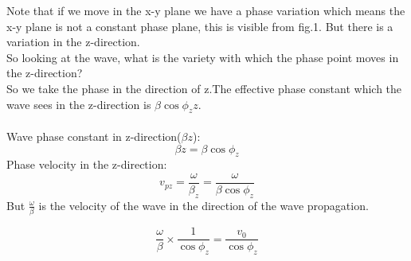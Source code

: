 Note that if we move in the x-y plane we have a phase variation which means the x-y plane is not a constant phase plane, this is visible from fig.1. But there is a variation in the z-direction.
\\
So looking at the wave, what is the variety with which the phase point moves in the z-direction?
\\
So we take the phase in the direction of z.The effective phase constant which the wave sees in the z-direction is $\beta\cos\phi_{z}z$.\\
\\
Wave phase constant in z-direction($\beta z$):
\begin{equation}
	\beta z = \beta\cos\phi_{z}
\end{equation}
Phase velocity in the z-direction:
\begin{equation}
	v_{pz} = \frac{\omega}{\beta_z} = \frac{\omega}{\beta\cos\phi_{z}}
\end{equation}
But $\frac{\omega}{\beta}$ is the velocity of the wave in the direction of the wave propagation.

\begin{equation}
	\frac{\omega}{\beta}\times \frac{1}{\cos\phi_{z}} = \frac{v_0}{\cos\phi_{z}}
\end{equation}

